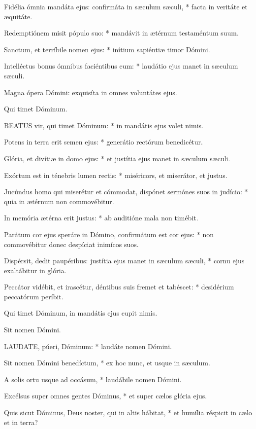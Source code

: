 Fidélia ómnia mandáta ejus: confirmáta in sæculum sæculi, * facta in veritáte et æquitáte.

Redemptiónem misit pópulo suo: * mandávit in ætérnum testaméntum suum.

Sanctum, et terríbile nomen ejus: * inítium sapiéntiæ timor Dómini.

Intelléctus bonus ómnibus faciéntibus eum: * laudátio ejus manet in sæculum sæculi.

 Magna ópera Dómini: exquisíta in omnes voluntátes ejus.

 Qui timet Dóminum.


\lettrine[lines=2]{B}{EATUS} vir, qui timet Dóminum: * in mandátis ejus volet nimis.

Potens in terra erit semen ejus: * generátio rectórum benedicétur.

Glória, et divítiæ in domo ejus: * et justítia ejus manet in sæculum sæculi.

Exórtum est in ténebris lumen rectis: * miséricors, et miserátor, et justus.

Jucúndus homo qui miserétur et cómmodat, dispónet sermónes suos in judício: * quia in ætérnum non commovébitur.

In memória ætérna erit justus: * ab auditióne mala non timébit.

Parátum cor ejus speráre in Dómino, confirmátum est cor ejus: * non commovébitur donec despíciat inimícos suos.

Dispérsit, dedit paupéribus: justítia ejus manet in sæculum sæculi, * cornu ejus exaltábitur in glória.

Peccátor vidébit, et irascétur, déntibus suis fremet et tabéscet: * desidérium peccatórum períbit.

 Qui timet Dóminum, in mandátis ejus cupit nimis.

 Sit nomen Dómini.


\lettrine[lines=2]{L}{AUDATE}, púeri, Dóminum: * laudáte nomen Dómini.

Sit nomen Dómini benedíctum, * ex hoc nunc, et usque in sæculum.

A solis ortu usque ad occásum, * laudábile nomen Dómini.

Excélsus super omnes gentes Dóminus, * et super cælos glória ejus.

Quis sicut Dóminus, Deus noster, qui in altis hábitat, * et humília réspicit in cælo et in terra?

